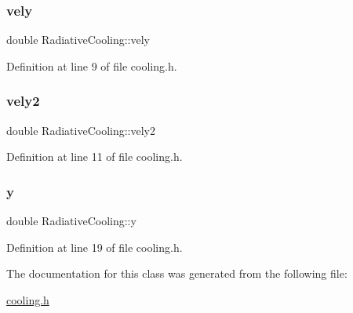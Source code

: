 \subsubsection{\texorpdfstring{vely}{vely}}
{\footnotesize\ttfamily double Radiative\+Cooling\+::vely\hspace{0.3cm}{\ttfamily [private]}}



Definition at line 9 of file cooling.\+h.

\mbox{\label{classRadiativeCooling_a75b752a6028b57c82d5c012603e6ef8a}} 
\subsubsection{\texorpdfstring{vely2}{vely2}}
{\footnotesize\ttfamily double Radiative\+Cooling\+::vely2\hspace{0.3cm}{\ttfamily [private]}}



Definition at line 11 of file cooling.\+h.

\mbox{\label{classRadiativeCooling_ad65d0d684858b39a7a5868c82cefb3ef}} 
\subsubsection{\texorpdfstring{y}{y}}
{\footnotesize\ttfamily double Radiative\+Cooling\+::y\hspace{0.3cm}{\ttfamily [private]}}



Definition at line 19 of file cooling.\+h.



The documentation for this class was generated from the following file\+:\begin{DoxyCompactItemize}
\item 
\hyperlink{cooling_8h}{cooling.\+h}\end{DoxyCompactItemize}

